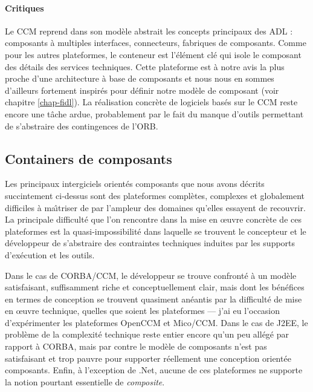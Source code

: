 \paragraph{Critiques}

Le \textsf{CCM} reprend dans son mod\`ele abstrait les concepts
principaux des \textsf{ADL} : composants \`a  multiples interfaces,
connecteurs, fabriques de composants. Comme pour les autres
plateformes, le conteneur est l'\'el\'ement cl\'e qui isole le
composant des d\'etails des services techniques. Cette plateforme est
\`a notre avis la plus proche d'une architecture \`a base de
composants et nous nous en sommes d'ailleurs fortement inspir\'es
pour d\'efinir notre mod\`ele de composant (voir chapitre
\ref{chap-fidl}). La r\'ealisation concr\`ete de logiciels bas\'es
sur le \textsf{CCM} reste encore une t\^ache ardue, probablement par
le fait du manque d'outils permettant de s'abstraire des contingences
de l'\textsf{ORB}.

\subsection{Containers de composants}

Les  principaux intergiciels orient\'es composants que nous avons
d\'ecrits succintement ci-dessus sont des plateformes compl\`etes,
complexes et globalement difficiles \`a ma\^{\i}triser de par l'ampleur
des domaines qu'elles essayent de recouvrir. La principale
difficult\'e que l'on rencontre dans la mise en \oe uvre concr\`ete
de ces plateformes est la
quasi-impossibilit\'e dans laquelle se trouvent le concepteur et le
d\'eveloppeur de  s'abstraire des contraintes techniques induites par
les supports d'ex\'ecution et les outils. 

Dans le cas de \textsf{CORBA/CCM},
le d\'eveloppeur se trouve confront\'e \`a un mod\`ele
satisfaisant, suffisamment riche et conceptuellement clair, mais dont
les b\'en\'efices en termes de conception se trouvent quasiment
an\'eantis par la difficult\'e de mise en \oe uvre technique,
quelles que soient les plateformes --- j'ai eu l'occasion
d'exp\'erimenter les plateformes \textsf{OpenCCM} et \textsf{Mico/CCM}. Dans le cas de
\textsf{J2EE}, le probl\`eme de la complexit\'e technique reste entier encore
qu'un peu all\'eg\'e par rapport \`a CORBA, mais par contre le
mod\`ele de composants n'est pas satisfaisant et trop pauvre pour
supporter r\'eellement une conception orient\'ee composants. Enfin,
\`a l'exception de \textsf{.Net}, aucune de ces plateformes ne
supporte la notion pourtant essentielle de \emph{composite}.


